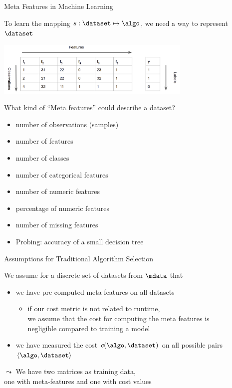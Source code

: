 \begin{frame}[c]{Meta Features in Machine Learning}

To learn the mapping $s: \dataset \mapsto \algo$, we need a way to represent $\dataset$

\begin{center}
	\includegraphics[width=0.7\textwidth]{images/ml_data}
\end{center}


What kind of ``Meta features'' could describe a dataset? \hands

\pause
\begin{itemize}
	\item number of observations (samples)
	\item number of features
	\item number of classes
	\item number of categorical features
	\item number of numeric features
	\item percentage of numeric features
	\item number of missing features
	\item Probing: accuracy of a small decision tree
\end{itemize}


\end{frame}
\begin{frame}[c]{Assumptions for Traditional Algorithm Selection}

We assume for a discrete set of datasets from $\mdata$ that
\begin{itemize}
	\item we have \alert{pre-computed meta-features} on all datasets
	\pause
	\begin{itemize}
		\item if our cost metric is not related to runtime,\\
		we assume that the cost for computing the meta features is\\ negligible compared to training a model
	\end{itemize}
	\pause
	\item we have measured the \alert{cost $c(\algo, \dataset)$} on all possible pairs $\langle \algo, \dataset\rangle$
\end{itemize}

\pause
\medskip

$\leadsto$ We have two matrices as training data,\\ one with meta-features and one with cost values

\end{frame}
